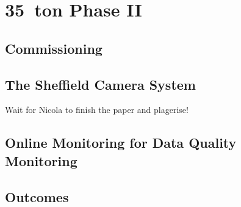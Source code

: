 \section{35~ton Phase II}\label{sec:35tonPhaseII}

\subsection{Commissioning}\label{sec:35tonCommissioning}

\subsection{The Sheffield Camera System}\label{sec:35tonCameraSystem}

Wait for Nicola to finish the paper and plagerise!

\subsection{Online Monitoring for Data Quality Monitoring}\label{sec:35tonOnlineMonitoring}

\subsection{Outcomes}\label{sec:35tonPhaseIIOutcomes}





































